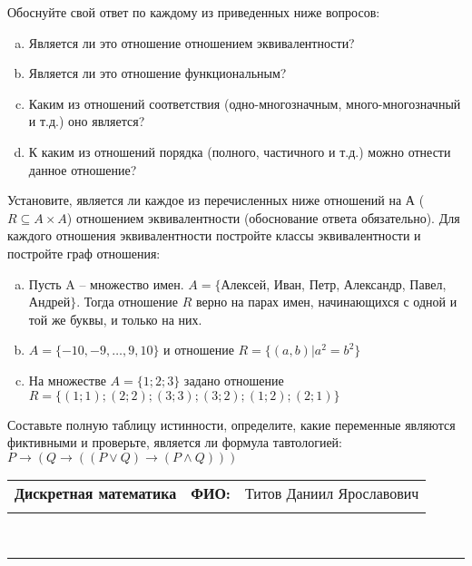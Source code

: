 \documentclass[10pt]{exam}
\newcommand{\class}{Дискретная математика}
\newcommand{\examdate}{}
\begin{document}
\begin{questions}
Обоснуйте свой ответ по каждому из приведенных ниже вопросов:
\begin{enumerate} [a)]\setcounter{enumi}{0}
    \item Является ли это отношение отношением эквивалентности?
    \item Является ли это отношение функциональным?
    \item Каким из отношений соответствия (одно-многозначным, много-многозначный и т.д.) оно является?
    \item К каким из отношений порядка (полного, частичного и т.д.) можно отнести данное отношение?
\end{enumerate}
\question
Установите, является ли каждое из перечисленных ниже отношений на А ($R \subseteq A \times A$) отношением эквивалентности (обоснование ответа обязательно). Для каждого отношения эквивалентности постройте классы 
эквивалентности и постройте граф отношения:
\begin{enumerate} [a)]\setcounter{enumi}{0}
\item Пусть A – множество имен. $A = \{ $Алексей, Иван, Петр, Александр, Павел, Андрей$ \}$. Тогда отношение $R$ верно на парах имен, начинающихся с одной и той же буквы, и только на них.
\item $A = \{-10, -9, … , 9, 10\}$ и отношение $ R = \{(a,b)|a^{2} = b^{2}\}$
\item На множестве $A = \{1; 2; 3\}$ задано отношение $R = \{(1; 1); (2; 2); (3; 3); (3; 2); (1; 2); (2; 1)\}$
\end{enumerate}\question Составьте полную таблицу истинности, определите, какие переменные являются фиктивными и проверьте, является ли формула тавтологией:
$ P \rightarrow (Q \rightarrow ((P \lor Q) \rightarrow (P \land Q)))$

\end{questions}
\newpage
\begin{flushright}
\begin{tabular}{p{2.8in} r l}
\textbf{\class} & \textbf{ФИО:} &Титов Даниил Ярославович
\\

\textbf{\examdate} &&\\
\end{tabular}\\
\end{flushright}
\rule[1ex]{\textwidth}{.1pt}
\end{document}
